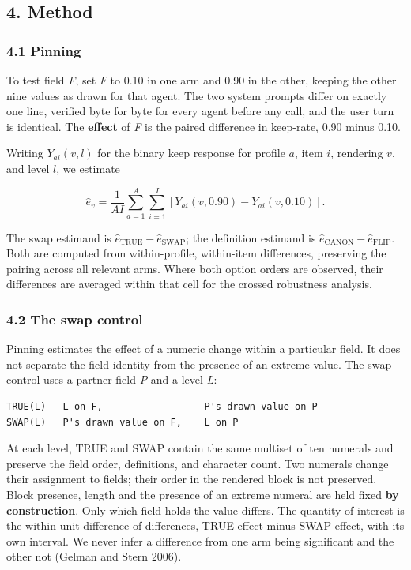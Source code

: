 \documentclass[
  11pt]{article}
\begin{document}
\subsection{4. Method}\label{method}

\subsubsection{4.1 Pinning}\label{pinning}

To test field \emph{F}, set \emph{F} to 0.10 in one arm and 0.90 in the
other, keeping the other nine values as drawn for that agent. The two
system prompts differ on exactly one line, verified byte for byte for
every agent before any call, and the user turn is identical. The
\textbf{effect} of \emph{F} is the paired difference in keep-rate, 0.90
minus 0.10.

Writing \(Y_{ai}(v,l)\) for the binary keep response for profile \(a\),
item \(i\), rendering \(v\), and level \(l\), we estimate

\[
\widehat e_v = \frac{1}{AI}\sum_{a=1}^{A}\sum_{i=1}^{I}
\left[Y_{ai}(v,0.90)-Y_{ai}(v,0.10)\right].
\]

The swap estimand is
\(\widehat e_{\mathrm{TRUE}}-\widehat e_{\mathrm{SWAP}}\); the
definition estimand is
\(\widehat e_{\mathrm{CANON}}-\widehat e_{\mathrm{FLIP}}\). Both are
computed from within-profile, within-item differences, preserving the
pairing across all relevant arms. Where both option orders are observed,
their differences are averaged within that cell for the crossed
robustness analysis.

\subsubsection{4.2 The swap control}\label{the-swap-control}

Pinning estimates the effect of a numeric change within a particular
field. It does not separate the field identity from the presence of an
extreme value. The swap control uses a partner field \emph{P} and a
level \emph{L}:

\begin{verbatim}
TRUE(L)   L on F,                  P's drawn value on P
SWAP(L)   P's drawn value on F,    L on P
\end{verbatim}

At each level, TRUE and SWAP contain the same multiset of ten numerals
and preserve the field order, definitions, and character count. Two
numerals change their assignment to fields; their order in the rendered
block is not preserved. Block presence, length and the presence of an
extreme numeral are held fixed \textbf{by construction}. Only which
field holds the value differs. The quantity of interest is the
within-unit difference of differences, TRUE effect minus SWAP effect,
with its own interval. We never infer a difference from one arm being
significant and the other not (Gelman and Stern 2006).
\end{document}
